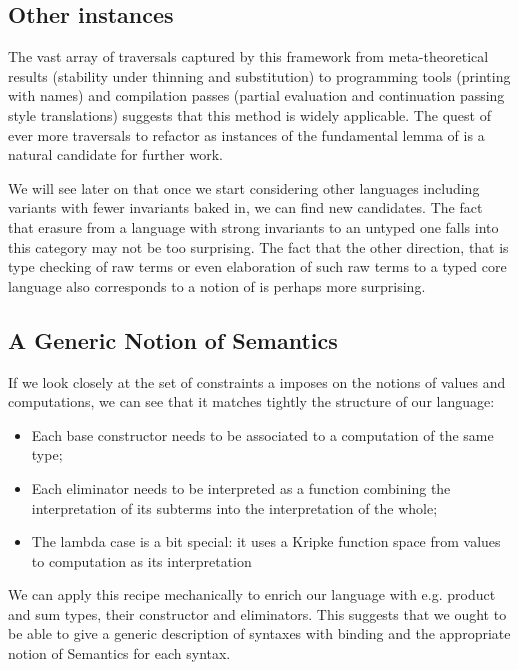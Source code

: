 \subsection{Other instances}

The vast array of traversals captured by this framework from meta-theoretical
results (stability under thinning and substitution) to programming tools
(printing with names) and compilation passes (partial evaluation and
continuation passing style translations) suggests that this method is widely
applicable. The quest of ever more traversals to refactor as instances of the
fundamental lemma of  is a natural candidate for further work.

We will see later on that once we start considering other languages including
variants with fewer invariants baked in, we can find new candidates. The fact
that erasure from a language with strong invariants to an untyped one falls
into this category may not be too surprising. The fact that the other direction,
that is type checking of raw terms or even elaboration of such raw terms to a
typed core language also corresponds to a notion of  is perhaps
more surprising.

\subsection{A Generic Notion of Semantics}

If we look closely at the set of constraints a  imposes on the
notions of values and computations, we can see that it matches tightly the
structure of our language:

\begin{itemize}
  \item Each base constructor needs to be associated to a computation of the
    same type;
  \item Each eliminator needs to be interpreted as a function combining the
    interpretation of its subterms into the interpretation of the whole;
  \item The lambda case is a bit special: it uses a Kripke function space
    from values to computation as its interpretation
\end{itemize}

We can apply this recipe mechanically to enrich our language with e.g.
product and sum types, their constructor and eliminators. This suggests
that we ought to be able to give a generic description of syntaxes with
binding and the appropriate notion of Semantics for each syntax.


